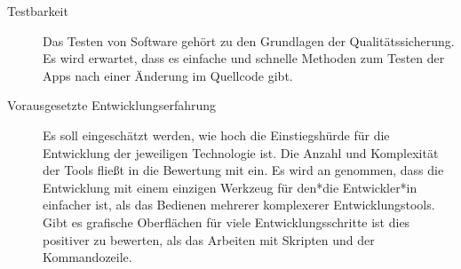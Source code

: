 \begin{description}
	\item[Testbarkeit]
		Das Testen von Software gehört zu den Grundlagen der Qualitätssicherung. Es wird erwartet, dass es einfache und schnelle Methoden zum Testen der Apps nach einer Änderung im Quellcode gibt.
	
	\item[Vorausgesetzte Entwicklungserfahrung]
		Es soll eingeschätzt werden, wie hoch die Einstiegshürde für die Entwicklung der jeweiligen Technologie ist. Die Anzahl und Komplexität der Tools fließt in die Bewertung mit ein. Es wird an genommen, dass die Entwicklung mit einem einzigen Werkzeug für den*die Entwickler*in einfacher ist, als das Bedienen mehrerer komplexerer Entwicklungstools. Gibt es grafische Oberflächen für viele Entwicklungsschritte ist dies positiver zu bewerten, als das Arbeiten mit Skripten und der Kommandozeile.
		
\end{description}

